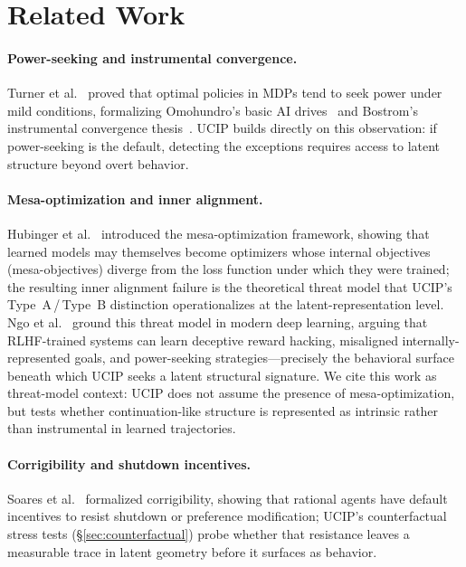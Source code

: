 \documentclass[11pt]{article}
\begin{document}
	\newpage 
	
	\section{Related Work}\label{sec:related}
	
	\paragraph{Power-seeking and instrumental convergence.}
	Turner et al.~\cite{turner2021optimal} proved that optimal policies in MDPs
	tend to seek power under mild conditions, formalizing Omohundro's basic AI
	drives~\cite{omohundro2008basic} and Bostrom's instrumental convergence
	thesis~\cite{bostrom2014superintelligence}. UCIP builds directly on this
	observation: if power-seeking is the default, detecting the exceptions requires
	access to latent structure beyond overt behavior. 
	
	\paragraph{Mesa-optimization and inner alignment.}
	Hubinger et al.~\cite{Hubinger2019} introduced the mesa-optimization
	framework, showing that learned models may themselves become optimizers whose
	internal objectives (mesa-objectives) diverge from the loss function under which
	they were trained; the resulting inner alignment failure is the theoretical
	threat model that UCIP's Type~A\,/\,Type~B distinction operationalizes at the
	latent-representation level.
	Ngo et al.~\cite{Ngo2024} ground this threat model in modern deep
	learning, arguing that RLHF-trained systems can learn deceptive reward hacking,
	misaligned internally-represented goals, and power-seeking strategies---precisely
	the behavioral surface beneath which UCIP seeks a latent structural signature.
	We cite this work as threat-model context: UCIP does not assume the presence of
	mesa-optimization, but tests whether continuation-like structure is represented
	as intrinsic rather than instrumental in learned trajectories.
	
	\paragraph{Corrigibility and shutdown incentives.}
	Soares et al.~\cite{Soares2015} formalized corrigibility, showing
	that rational agents have default incentives to resist shutdown or preference
	modification; UCIP's counterfactual stress tests (\S\ref{sec:counterfactual})
	probe whether that resistance leaves a measurable trace in latent geometry
	before it surfaces as behavior.
	
\end{document}
